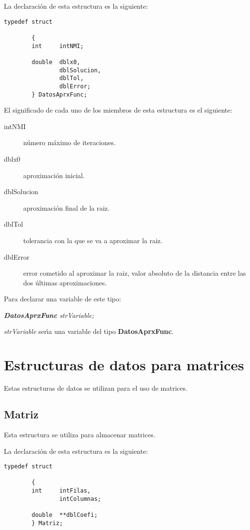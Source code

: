 La declaraci\'on de esta estructura es la siguiente:

\begin{verbatim}
typedef struct

        {
        int     intNMI;

        double  dblx0,
                dblSolucion,
                dblTol,
                dblError; 
        } DatosAprxFunc;
\end{verbatim}

El significado de cada uno de los miembros de esta estructura es el siguiente:

\begin{description}
\item[intNMI] n\'umero m\'aximo de iteraciones.
\item[dblx0] aproximaci\'on inicial.
\item[dblSolucion] aproximaci\'on final de la raiz.
\item[dblTol] tolerancia con la que se va a aproximar la raiz.
\item[dblError] error cometido al aproximar la raiz, valor absoluto de la 
distancia entre las dos \'ultimas aproximaciones.
\end{description}

Para declarar una variable de este tipo:

\begin{center}
\emph{\textbf{DatosAprxFunc} strVariable;}
\end{center}

\emph{strVariable} ser\'{\i}a una variable del tipo \textbf{DatosAprxFunc}.

\section{Estructuras de datos para matrices}

Estas estructuras de datos se utilizan para el uso de matrices.

\subsection{Matriz} \label{sec:strMatriz}

Esta estructura se utiliza para almacenar matrices.\newline

La declaraci\'on de esta estructura es la siguiente:

\begin{verbatim}
typedef struct

        {
        int     intFilas,
                intColumnas;

        double  **dblCoefi;
        } Matriz;
\end{verbatim}

